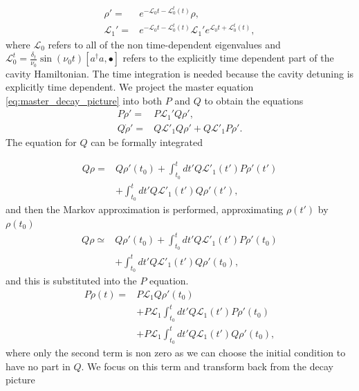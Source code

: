 \documentclass[reprint, amsmath,amssymb, aps,pra]{revtex4-1}
\begin{document}
\begin{align}
\rho' =& e^{-\mathcal{L}_0t - \mathcal{L}_0^t(t)}\rho,\\
\mathcal{L}_1' =&e^{-\mathcal{L}_0t - \mathcal{L}_0^t(t)}\mathcal{L}_1' e^{\mathcal{L}_0t +\mathcal{L}_0^t(t)},
\end{align} where $\mathcal{L}_0$ refers to all of the non time-dependent eigenvalues and $\mathcal{L}_0^t=\frac{\delta_t}{\nu_0} \sin(\nu_0t)[a^\dagger a,\bullet]$ refers to the explicitly time dependent part of the cavity Hamiltonian.  The time integration is needed because the cavity detuning is explicitly time dependent. We project the master equation \eqref{eq:master_decay_picture} into
both $P$ and $Q$ to obtain the equations 
\begin{align*}
P\dot{\rho}' =& P\mathcal{L}_1'Q\rho', \\
Q\dot{\rho}' =& Q\mathcal{L}'_1Q\rho' + Q\mathcal{L}'_1P\rho'.
\end{align*} The equation for $Q$ can be formally integrated

\begin{align*}
Q\rho =& Q\rho'(t_0) + \int_{t_0}^{t}dt' Q\mathcal{L}'_1(t')P\rho'(t')\\
       &+\int_{t_0}^{t}dt'Q\mathcal{L}'_1(t')Q\rho'(t'),
\end{align*}
 and then the Markov approximation is performed, approximating $\rho(t')$ by $\rho(t_0)$
\begin{align*}
Q\rho\simeq & Q\rho'(t_0) + \int_{t_0}^{t}dt' Q\mathcal{L}'_1(t')P\rho'(t_0)\\
       &+\int_{t_0}^{t}dt'Q\mathcal{L}'_1(t')Q\rho'(t_0),
\end{align*}
and this is substituted into the $P$ equation. 
\begin{align}
P\dot{\rho}(t) =& P\mathcal{L}_1Q\rho'(t_0)\\ 
 &+ P\mathcal{L}_1\int_{t_0}^{t}dt' Q\mathcal{L}_1(t')P\rho'(t_0)\nonumber \\
 &+ P\mathcal{L}_1\int_{t_0}^{t}dt'Q\mathcal{L}_1(t')Q\rho'(t_0)\nonumber,
\end{align}
where only the second term is non zero as we can choose the initial condition to have no part in $Q$. We focus on this term and transform back from the decay
picture
\end{document}
